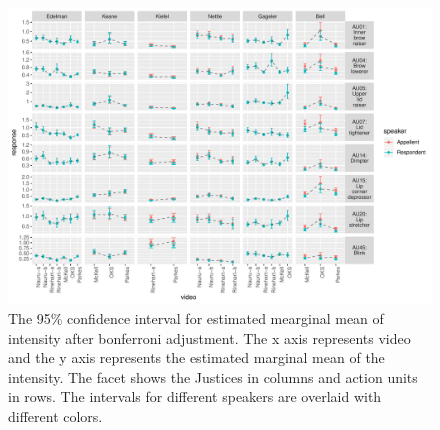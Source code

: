 \documentclass{monashthesis}
\begin{document}
\begin{figure}

{\centering \includegraphics[width=1\linewidth]{figures/intensity-speaker-1} 

}

\caption{The 95\% confidence interval for estimated mearginal mean of intensity after bonferroni adjustment. The x axis represents video and the y axis represents the estimated marginal mean of the intensity. The facet shows the Justices in columns and action units in rows. The intervals for different speakers are overlaid with different colors.}\label{fig:intensity-speaker}
\end{figure}

\printbibliography[heading=bibintoc]
\end{document}
